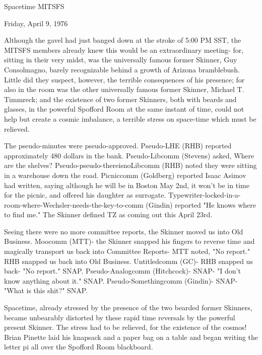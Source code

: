 \documentclass[12pt]{article}
\begin{document}
\begin{center}

Spacetime MITSFS

Friday, April 9, 1976

\end{center}
 
\vspace{12pt}

\setlength{\parskip}{6pt}

\noindent
Although the gavel had just banged down at the stroke of 5:00 PM SST, the MITSFS members already knew this would be an extraordinary meeting- for, sitting in their very midst, was the universally famous former Skinner, Guy Consolmagno, barely recognizable behind a growth of Arizona bramblebush. Little did they suspect, however, the terrible consequences of his presence; for also in the room was the other universally famous former Skinner, Michael T. Timmreck; and the existence of two former Skinners, both with beards and glasses, in the powerful Spofford Room at the same instant of time, could not help but create a cosmic imbalance, a terrible stress on space-time which must be relieved.

The pseudo-minutes were pseudo-approved. Pseudo-LHE (RHB) reported approximately 480 dollars in the bank. Pseudo-Libcomm (Stevens) asked, Where are the shelves? Pseudo-pseudo-thereisnoLibcomm (RHB) noted they were sitting in a warehouse down the road. Picniccomm (Goldberg) reported Isaac Asimov had written, saying although he will be in Boston May 2nd, it won't be in time for the picnic, and offered his daughter as surrogate. Typewriter-locked-in-a-room-where-Wechsler-needs-the-key-to-comm (Gindin) reported "He knows where to find me." The Skinner defined TZ as coming out this April 23rd.

Seeing there were no more committee reports, the Skinner moved us into Old Business. Moocomm (MTT)- the Skinner snapped his fingers to reverse time and magically transport us back into Committee Reports- MTT noted, "No report." RHB snapped us back into Old Business. Untitledcomm (GC)- RHB snapped us back- "No report." SNAP. Pseudo-Analogcomm (Hitchcock)- SNAP- "I don't know anything about it." SNAP. Pseudo-Somethingcomm (Gindin)- SNAP- "What is this shit?" SNAP.

Spacetime, already stressed by the presence of the two bearded former Skinners, became unbearably distorted by these rapid time reversals by the powerful present Skinner. The stress had to be relieved, for the existence of the cosmos! Brian Pinette laid his knapsack and a paper bag on a table and began writing the letter pi all over the Spofford Room blackboard.
\end{document}
